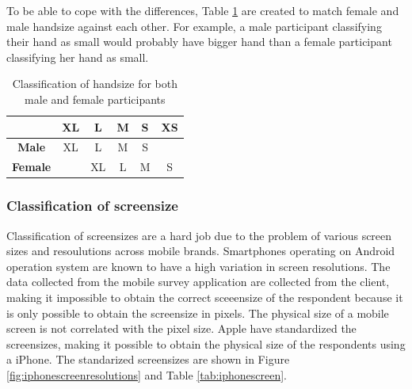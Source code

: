     To be able to cope with the differences, Table \ref{tab:classificationhandsize} are created to match female and male handsize against each other. For example, a male participant classifying their hand as small would probably have bigger hand than a female participant classifying her hand as small. 

    \begin{table}[H]
      \centering
      \begin{tabular}{ c || c | c | c | c | c }
        \hline
         & {\bf XL} & {\bf L} & {\bf M} & {\bf S} & {\bf XS} \\ \hline\hline
        {\bf Male}   & XL & L  & M & S &   \\
        {\bf Female} &    & XL & L & M & S \\ \hline
      \end{tabular}
      \caption{Classification of handsize for both male and female participants}
      \label{tab:classificationhandsize}
    \end{table}

    \subsubsection{Classification of screensize}


    Classification of screensizes are a hard job due to the problem of various screen sizes and resoulutions across mobile brands. Smartphones operating on Android operation system are known to have a high variation in screen resolutions. The data collected from the mobile survey application are collected from the client, making it impossible to obtain the correct sceeensize of the respondent because it is only possible to obtain the screensize in pixels. The physical size of a mobile screen is not correlated with the pixel size. Apple have standardized the screensizes, making it possible to obtain the physical size of the respondents using a iPhone. The standarized screensizes are shown in Figure \ref{fig:iphonescreenresolutions} and Table \ref{tab:iphonescreen}.

